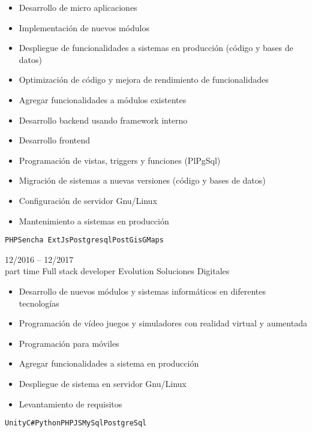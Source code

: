 \begin{entrylist}
{\begin{itemize}
    	        \setlength\itemsep{0pt}
    	        \setlength\parskip{0pt}
    	        \item Desarrollo de micro aplicaciones
    	        \item Implementación de nuevos módulos
    	        \item Despliegue de funcionalidades a sistemas en producción (código y bases de datos)
    	        \item Optimización de código y mejora de rendimiento de funcionalidades
    	        \item Agregar funcionalidades a módulos existentes
    	        \item Desarrollo backend usando framework interno
    	        \item Desarrollo frontend
    	        \item Programación de vistas, triggers y funciones (PlPgSql)
    	        \item Migración de sistemas a nuevas versiones (código y bases de datos)
    	        \item Configuración de servidor Gnu/Linux
    	        \item Mantenimiento a sistemas en producción
    	    \end{itemize}
		    \texttt{PHP}\slashsep\texttt{Sencha ExtJs}\slashsep\texttt{Postgresql}\slashsep\texttt{PostGis}\slashsep\texttt{GMaps}
        }
	\entry
		{12/2016 -- 12/2017\\\footnotesize{part time}}
		{Full stack developer}
		{Evolution Soluciones Digitales}
		{
		    \vspace{-5mm}
    	    \begin{itemize}
    	        \setlength\itemsep{0pt}
    	        \setlength\parskip{0pt}
    	        \item Desarrollo de nuevos módulos y sistemas informáticos en diferentes tecnologías
    	        \item Programación de vídeo juegos y simuladores con realidad virtual y aumentada
    	        \item Programación para móviles
    	        \item Agregar funcionalidades a sistema en producción
    	        \item Despliegue de sistema en servidor Gnu/Linux
    	        \item Levantamiento de requisitos
    	    \end{itemize}\texttt{Unity}\slashsep\texttt{C\#}\slashsep\texttt{Python}\slashsep\texttt{PHP}\slashsep\texttt{JS}\slashsep\texttt{MySql}\slashsep\texttt{PostgreSql}
}
\end{entrylist}

